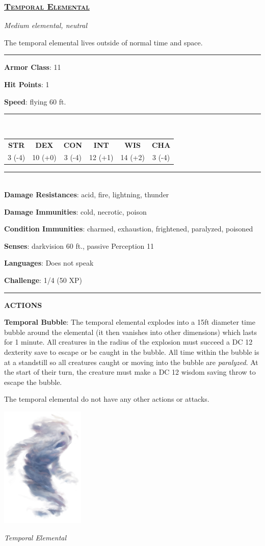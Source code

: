 \subsubsection*{\underline{\textsc{\Large Temporal Elemental}}}
\noindent\emph{Medium elemental, neutral}

The temporal elemental lives outside of normal time and space.

\noindent\rule{0.5\textwidth}{0.5pt}

\noindent\textbf{Armor Class}: 11

\noindent\textbf{Hit Points}: 1

\noindent\textbf{Speed}: flying 60 ft.

\noindent\rule{0.5\textwidth}{0.5pt} \\
\begin{table}[H]
	\begin{tabular}{cccccc}
		\textbf{STR} & \textbf{DEX} & \textbf{CON} & \textbf{INT} & \textbf{WIS} & \textbf{CHA} \\
		3 (-4) & 10 (+0) & 3 (-4) & 12 (+1) & 14 (+2) & 3 (-4) \\
	\end{tabular}
\end{table}
\noindent\rule{0.5\textwidth}{0.5pt} \\

\noindent\textbf{Damage Resistances}: acid, fire, lightning, thunder

\noindent\textbf{Damage Immunities}: cold, necrotic, poison

\noindent\textbf{Condition Immunities}: charmed, exhaustion, frightened, paralyzed, poisoned

\noindent\textbf{Senses}: darkvision 60 ft., passive Perception 11

\noindent\textbf{Languages}: Does not speak

\noindent\textbf{Challenge}: 1/4 (50 XP)

\noindent\rule{0.5\textwidth}{0.5pt}

\noindent\textbf{ACTIONS}

\noindent\textbf{Temporal Bubble}: The temporal elemental explodes into a 15ft diameter time bubble around the elemental (it then vanishes into other dimensions) which lasts for 1 minute. All creatures in the radius of the explosion must succeed a DC 12 dexterity save to escape or be caught in the bubble. All time within the bubble is at a standstill so all creatures caught or moving into the bubble are \emph{paralyzed}.  At the start of their turn, the creature must make a DC 12 wisdom saving throw to escape the bubble.

The temporal elemental do not have any other actions or attacks.

\begin{center}
	\includegraphics[width = 0.3\textwidth]{temporal-elemental}
	
	\emph{Temporal Elemental}
\end{center}